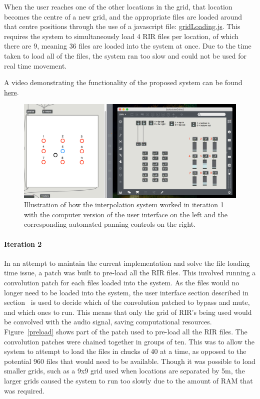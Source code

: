 \documentclass[../../main.tex]{subfiles}
\begin{document}
		 	When the user reaches one of the other locations in the grid, that location becomes the centre of a new grid, and the appropriate files are loaded around that centre positions through the use of a javascript file: \href{http://lt669.github.io/code/javascript/html/gridLoading.html}{gridLoading.js}. This requires the system to simultaneously load 4 \ac{RIR} files per location, of which there are 9, meaning 36 files are loaded into the system at once. Due to the time taken to load all of the files, the system ran too slow and could not be used for real time movement.

		 	A video demonstrating the functionality of the proposed system can be found \href{http://lt669.github.io/pages/videos.html}{here}.

			\begin{figure}[H]
				\centerline{\includegraphics[width=\textwidth]{Sections/Implementation/Max/images/Max/iteration1/panning_edit2.png}}
				\caption{Illustration of how the interpolation system worked in iteration 1 with the computer version of the user interface on the left and the corresponding automated panning controls on the right.}
				\label{iteration1Panning}
			\end{figure}


		 \paragraph{Iteration 2}

		 	In an attempt to maintain the current implementation and solve the file loading time issue, a patch was built to pre-load all the \ac{RIR} files. This involved running a convolution patch for each files loaded into the system. As the files would no longer need to be loaded into the system, the user interface section described in section~ is used to decide which of the convolution patched to bypass and mute, and which ones to run. This means that only the grid of \ac{RIR}'s being used would be convolved with the audio signal, saving computational resources. Figure~\ref{preload} shows part of the patch used to pre-load all the \ac{RIR} files. The convolution patches were chained together in groups of ten. This was to allow the system to attempt to load the files in chucks of 40 at a time, as opposed to the potential 960 files that would need to be available. Though it was possible to load smaller grids, such as a 9x9 grid used when locations are separated by 5m, the larger grids caused the system to run too slowly due to the amount of RAM that was required.
\end{document}
